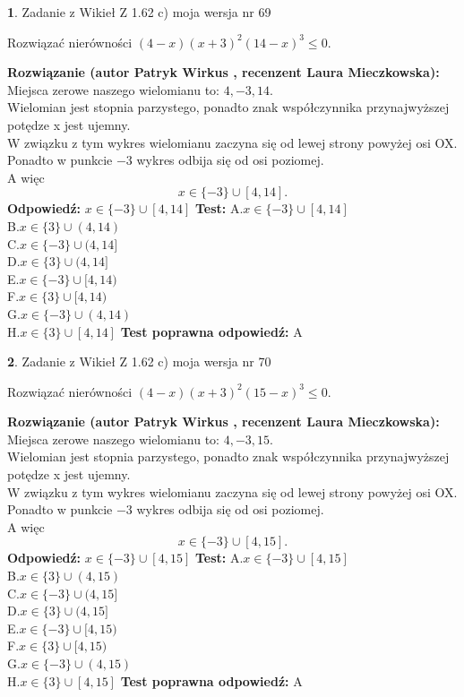 \documentclass[12pt, a4paper]{article}
\theoremstyle{definition} %
\newtheorem{zad}{}
\newcommand{\zadStart}[1]{\begin{zad}#1\newline}
\newcommand{\zadStop}{\end{zad}}
\newcommand{\rozwStart}[2]{\noindent \textbf{Rozwiązanie (autor #1 , recenzent #2): }\newline}
\newcommand{\rozwStop}{\newline}
\newcommand{\odpStart}{\noindent \textbf{Odpowiedź:}\newline}
\newcommand{\odpStop}{\newline}
\newcommand{\testStart}{\noindent \textbf{Test:}\newline}
\newcommand{\testStop}{\newline}
\newcommand{\kluczStart}{\noindent \textbf{Test poprawna odpowiedź:}\newline}
\newcommand{\kluczStop}{\newline}
\begin{document}
\zadStart{Zadanie z Wikieł Z 1.62 c) moja wersja nr 69}

Rozwiązać nierówności $(4-x)(x+3)^{2}(14-x)^{3}\le0$.
\zadStop
\rozwStart{Patryk Wirkus}{Laura Mieczkowska}
Miejsca zerowe naszego wielomianu to: $4, -3, 14$.\\
Wielomian jest stopnia parzystego, ponadto znak współczynnika przy\linebreak najwyższej potędze x jest ujemny.\\ W związku z tym wykres wielomianu zaczyna się od lewej strony powyżej osi OX.\\
Ponadto w punkcie $-3$ wykres odbija się od osi poziomej.\\
A więc $$x \in \{-3\} \cup [4,14].$$
\rozwStop
\odpStart
$x \in \{-3\} \cup [4,14]$
\odpStop
\testStart
A.$x \in \{-3\} \cup [4,14]$\\
B.$x \in \{3\} \cup (4,14)$\\
C.$x \in \{-3\} \cup (4,14]$\\
D.$x \in \{3\} \cup (4,14]$\\
E.$x \in \{-3\} \cup [4,14)$\\
F.$x \in \{3\} \cup [4,14)$\\
G.$x \in \{-3\} \cup (4,14)$\\
H.$x \in \{3\} \cup [4,14]$
\testStop
\kluczStart
A
\kluczStop



\zadStart{Zadanie z Wikieł Z 1.62 c) moja wersja nr 70}

Rozwiązać nierówności $(4-x)(x+3)^{2}(15-x)^{3}\le0$.
\zadStop
\rozwStart{Patryk Wirkus}{Laura Mieczkowska}
Miejsca zerowe naszego wielomianu to: $4, -3, 15$.\\
Wielomian jest stopnia parzystego, ponadto znak współczynnika przy\linebreak najwyższej potędze x jest ujemny.\\ W związku z tym wykres wielomianu zaczyna się od lewej strony powyżej osi OX.\\
Ponadto w punkcie $-3$ wykres odbija się od osi poziomej.\\
A więc $$x \in \{-3\} \cup [4,15].$$
\rozwStop
\odpStart
$x \in \{-3\} \cup [4,15]$
\odpStop
\testStart
A.$x \in \{-3\} \cup [4,15]$\\
B.$x \in \{3\} \cup (4,15)$\\
C.$x \in \{-3\} \cup (4,15]$\\
D.$x \in \{3\} \cup (4,15]$\\
E.$x \in \{-3\} \cup [4,15)$\\
F.$x \in \{3\} \cup [4,15)$\\
G.$x \in \{-3\} \cup (4,15)$\\
H.$x \in \{3\} \cup [4,15]$
\testStop
\kluczStart
A
\kluczStop
\end{document}
